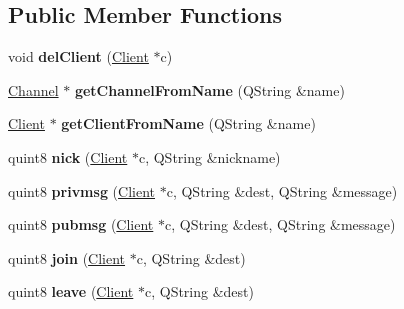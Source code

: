 \subsection*{Public Member Functions}
\begin{DoxyCompactItemize}
\item 
\hypertarget{class_server_a41439069e542281267592615814c8567}{void {\bfseries del\-Client} (\hyperlink{class_client}{Client} $\ast$c)}\label{class_server_a41439069e542281267592615814c8567}

\item 
\hypertarget{class_server_a1b6b3b2c620394e09c76cac09f25d42c}{\hyperlink{class_channel}{Channel} $\ast$ {\bfseries get\-Channel\-From\-Name} (Q\-String \&name)}\label{class_server_a1b6b3b2c620394e09c76cac09f25d42c}

\item 
\hypertarget{class_server_af1d077654e4ae963ead3d188946b1ec8}{\hyperlink{class_client}{Client} $\ast$ {\bfseries get\-Client\-From\-Name} (Q\-String \&name)}\label{class_server_af1d077654e4ae963ead3d188946b1ec8}

\item 
\hypertarget{class_server_a71ae8b02449d7322528500584c4ebe6c}{quint8 {\bfseries nick} (\hyperlink{class_client}{Client} $\ast$c, Q\-String \&nickname)}\label{class_server_a71ae8b02449d7322528500584c4ebe6c}

\item 
\hypertarget{class_server_aaeb34212af60bac0d2901abcf88d000e}{quint8 {\bfseries privmsg} (\hyperlink{class_client}{Client} $\ast$c, Q\-String \&dest, Q\-String \&message)}\label{class_server_aaeb34212af60bac0d2901abcf88d000e}

\item 
\hypertarget{class_server_a32c38ccc35ed3a501f64e7ddf74bfef9}{quint8 {\bfseries pubmsg} (\hyperlink{class_client}{Client} $\ast$c, Q\-String \&dest, Q\-String \&message)}\label{class_server_a32c38ccc35ed3a501f64e7ddf74bfef9}

\item 
\hypertarget{class_server_a561cd772e1d1484711b45cd884072db6}{quint8 {\bfseries join} (\hyperlink{class_client}{Client} $\ast$c, Q\-String \&dest)}\label{class_server_a561cd772e1d1484711b45cd884072db6}

\item 
\hypertarget{class_server_aa4b10e994e7685a5d74ec56bbd9923b5}{quint8 {\bfseries leave} (\hyperlink{class_client}{Client} $\ast$c, Q\-String \&dest)}\label{class_server_aa4b10e994e7685a5d74ec56bbd9923b5}


\end{DoxyCompactItemize}
